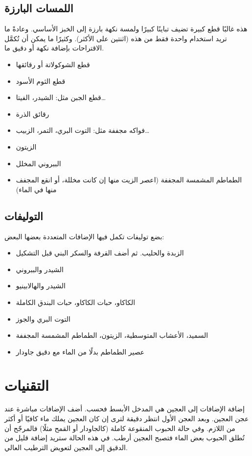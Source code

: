 \subsection{اللمسات البارزة}
هذه غالبًا قطع كبيرة تضيف تباينًا كبيرًا ولمسة نكهة بارزة إلى الخبز الأساسي. وعادةً ما تريد استخدام واحدة فقط من هذه (اثنتين على الأكثر). وكثيرًا ما يمكن أن تُكمَّل الاقتراحات بإضافة نكهة أو دقيق ما.

\begin{itemize}
\item قطع الشوكولاتة أو رقائقها
\item قطع الثوم الأسود
\item قطع الجبن مثل: الشيدر، الفيتا…
\item رقائق الذرة
\item فواكه مجففة مثل: التوت البري، التمر، الزبيب…
\item الزيتون
\item الببروني المخلل
\item الطماطم المشمسة المجففة (اعصر الزيت منها إن كانت مخللة، أو انقع المجفف منها في الماء)
\end{itemize}

\subsection{التوليفات}
بضع توليفات تكمل فيها الإضافات المتعددة بعضها البعض:

\begin{itemize}
\item الزبدة والحليب. ثم أضف القرفة والسكر البني قبل التشكيل
\item الشيدر والببروني
\item الشيدر والهالابينيو
\item الكاكاو، حبات الكاكاو، حبات البندق الكاملة
\item التوت البري والجوز
\item السميد، الأعشاب المتوسطية، الزيتون، الطماطم المشمسة المجففة
\item عصير الطماطم بدلًا من الماء مع  دقيق جاودار
\end{itemize}

\section{التقنيات}

إضافة الإضافات إلى العجين هي المدخل الأبسط فحسب. أضف الإضافات مباشرة عند عجن العجين. وبعد العجن الأول انتظر  دقيقة لترى إن كان العجين يملك ماء كافيًا أو أكثر من اللازم. وفي حالة الحبوب المنقوعة كاملة (كالجاودار أو القمح مثلًا) فالمرجّح أن تُطلق الحبوب بعض الماء فتصبح العجين أرطب. في هذه الحالة ستريد إضافة قليل من الدقيق إلى العجين لتعويض الترطيب العالي.

